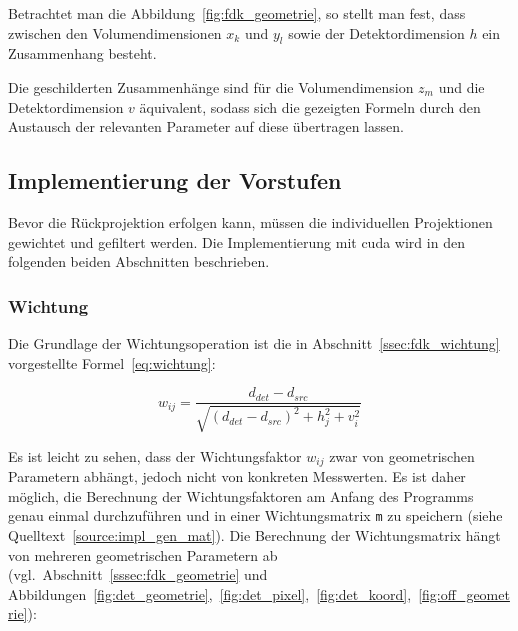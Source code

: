 Betrachtet man die Abbildung~\ref{fig:fdk_geometrie}, so stellt man fest, dass zwischen den Volumendimensionen $x_k$ und
$y_l$ sowie der Detektordimension $h$ ein Zusammenhang besteht.

Die geschilderten Zusammenhänge sind für die Volumendimension $z_m$ und die Detektordimension $v$ äquivalent, sodass
sich die gezeigten Formeln durch den Austausch der relevanten Parameter auf diese übertragen lassen.

\subsection{Implementierung der Vorstufen}

Bevor die Rückprojektion erfolgen kann, müssen die individuellen Projektionen gewichtet und gefiltert werden. Die
Implementierung mit \gls{cuda} wird in den folgenden beiden Abschnitten beschrieben.

\subsubsection{Wichtung}

Die Grundlage der Wichtungsoperation ist die in Abschnitt~\ref{ssec:fdk_wichtung} vorgestellte
Formel~\ref{eq:wichtung}:

\begin{equation*}
    w_{ij} = \frac{d_{det} - d_{src}}{\sqrt{(d_{det} - d_{src})^2 + h_j^2 + v_i^2}}
\end{equation*}

Es ist leicht zu sehen, dass der Wichtungsfaktor $w_{ij}$ zwar von geometrischen Parametern abhängt, jedoch nicht von
konkreten Messwerten. Es ist daher möglich, die Berechnung der Wichtungsfaktoren am Anfang des Programms genau einmal
durchzuführen und in einer Wichtungsmatrix \texttt{m} zu speichern (siehe Quelltext~\ref{source:impl_gen_mat}). Die
Berechnung der Wichtungsmatrix hängt von mehreren geometrischen Parametern ab (vgl.\
Abschnitt~\ref{sssec:fdk_geometrie} und
Abbildungen~\ref{fig:det_geometrie},~\ref{fig:det_pixel},~\ref{fig:det_koord},~\ref{fig:off_geometrie}):

